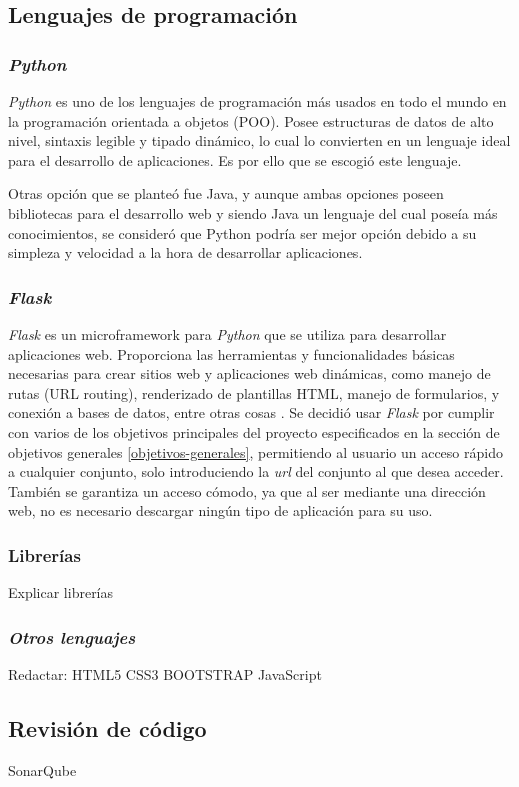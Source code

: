 \subsection{Lenguajes de programación}

\subsubsection{\textit{Python}}
\textit{Python} es uno de los lenguajes de programación más usados en todo el mundo en la programación orientada a objetos (POO). Posee estructuras de datos de alto nivel, sintaxis legible y tipado dinámico, lo cual lo convierten en un lenguaje ideal para el desarrollo de aplicaciones. Es por ello que se escogió este lenguaje.\cite{python}

Otras opción que se planteó fue Java, y aunque ambas opciones poseen bibliotecas para el desarrollo web y siendo Java un lenguaje del cual poseía más conocimientos, se consideró que Python podría ser mejor opción debido a su simpleza y velocidad a la hora de desarrollar aplicaciones.

\subsubsection{\textit{Flask}}
\textit{Flask} es un microframework para \textit{Python} que se utiliza para desarrollar aplicaciones web. Proporciona las herramientas y funcionalidades básicas necesarias para crear sitios web y aplicaciones web dinámicas, como manejo de rutas (URL routing), renderizado de plantillas HTML, manejo de formularios, y conexión a bases de datos, entre otras cosas \cite{FlaskSite}. 
Se decidió usar \textit{Flask} por cumplir con varios de los objetivos principales del proyecto especificados en la sección de objetivos generales \ref{objetivos-generales}, permitiendo al usuario un acceso rápido a cualquier conjunto, solo introduciendo la \textit{url} del conjunto al que desea acceder. También se garantiza un acceso cómodo, ya que al ser mediante una dirección web, no es necesario descargar ningún tipo de aplicación para su uso.

\subsubsection{Librerías}
Explicar librerías


\subsubsection{\textit{Otros lenguajes}}
Redactar:
HTML5 
CSS3 
BOOTSTRAP 
JavaScript 


\subsection{Revisión de código}
SonarQube